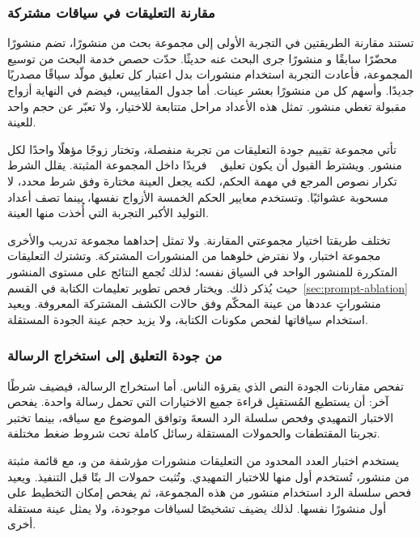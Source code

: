 \subsubsection{مقارنة التعليقات في سياقات مشتركة}
تستند مقارنة الطريقتين في التجربة الأولى إلى مجموعة بحث من  منشورًا، تضم  منشورًا محضّرًا سابقًا و منشورًا جرى البحث عنه حديثًا. حدّت حصص خدمة البحث من توسيع المجموعة، فأعادت التجربة استخدام منشورات بدل اعتبار كل تعليق مولّد سياقًا مصدريًا جديدًا. وأسهم كل من  منشورًا بعشر عينات. أما جدول المقاييس، فيضم في النهاية  أزواج مقبولة تغطي  منشور. تمثل هذه الأعداد مراحل متتابعة للاختيار، ولا تعبّر عن حجم واحد للعينة.

تأتي مجموعة تقييم جودة التعليقات من تجربة منفصلة، وتختار زوجًا مؤهلًا واحدًا لكل منشور. ويشترط القبول أن يكون تعليق ~\cite{lin2024zero} فريدًا داخل المجموعة المثبتة. يقلل الشرط تكرار نصوص المرجع في مهمة الحكم، لكنه يجعل العينة مختارة وفق شرط محدد، لا مسحوبة عشوائيًا. وتستخدم معايير الحكم الخمسة الأزواج نفسها، بينما تصف أعداد التوليد الأكبر التجربة التي أُخذت منها العينة.

تختلف طريقتا اختيار مجموعتي المقارنة. ولا تمثل إحداهما مجموعة تدريب والأخرى مجموعة اختبار، ولا نفترض خلوهما من المنشورات المشتركة. وتشترك التعليقات المتكررة للمنشور الواحد في السياق نفسه؛ لذلك تُجمع النتائج على مستوى المنشور حيث يُذكر ذلك.
ويختار فحص تطوير تعليمات الكتابة في القسم~\ref{sec:prompt-ablation} منشوراتٍ عددها \NUM{\DsPromptPosts} من عينة المحكّم وفق حالات الكشف المشتركة المعروفة. ويعيد استخدام سياقاتها لفحص مكونات الكتابة، ولا يزيد حجم عينة الجودة المستقلة.

\subsubsection{من جودة التعليق إلى استخراج الرسالة}
تفحص مقارنات الجودة النص الذي يقرؤه الناس. أما استخراج الرسالة، فيضيف شرطًا آخر: أن يستطيع المُستقبِل قراءة جميع الاختيارات التي تحمل رسالة واحدة. يفحص الاختبار التمهيدي وفحص سلسلة الرد السعةَ وتوافق الموضوع مع سياقه، بينما تختبر تجربتا المقتطفات والحمولات المستقلة رسائل كاملة تحت شروط ضغط مختلفة.

يستخدم اختبار العدد المحدود من التعليقات منشورات مؤرشفة من  و، مع قائمة مثبتة من  منشور، تُستخدم أول  منها للاختبار التمهيدي. وتُثبت حمولات الـ بتًا قبل التنفيذ. ويعيد فحص سلسلة الرد استخدام منشور من هذه المجموعة، ثم يفحص إمكان التخطيط على أول  منشورًا نفسها. لذلك يضيف تشخيصًا لسياقات موجودة، ولا يمثل عينة مستقلة أخرى.


